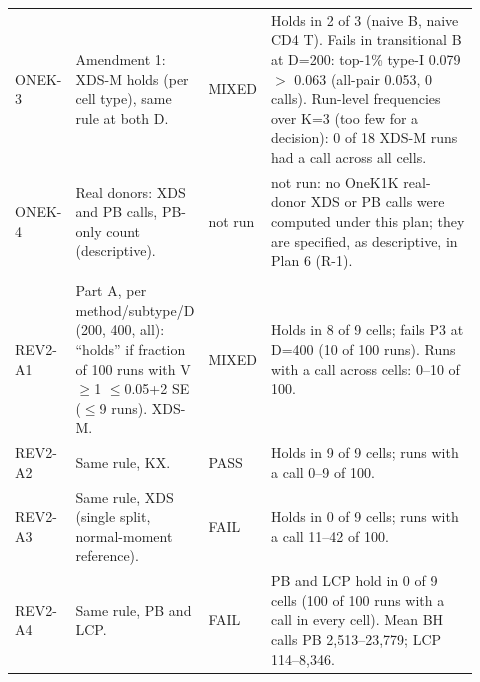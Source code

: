\begin{table}[p]
\begin{tabular}{@{}>{\raggedright\arraybackslash}p{0.100\linewidth}>{\raggedright\arraybackslash}p{0.285\linewidth}>{\raggedright\arraybackslash}p{0.085\linewidth}>{\raggedright\arraybackslash}p{0.450\linewidth}@{}}
ONEK-3 & Amendment 1: XDS-M holds (per cell type), same rule at both D. & MIXED & Holds in 2 of 3 (naive B, naive CD4 T). Fails in transitional B at D=200: top-1\% type-I 0.079 $>$ 0.063 (all-pair 0.053, 0 calls). Run-level frequencies over K=3 (too few for a decision): 0 of 18 XDS-M runs had a call across all cells. \\
ONEK-4 & Real donors: XDS and PB calls, PB-only count (descriptive). & not run & not run: no OneK1K real-donor XDS or PB calls were computed under this plan; they are specified, as descriptive, in Plan 6 (R-1). \\
\addlinespace[3pt]
\multicolumn{4}{@{}>{\raggedright\arraybackslash}p{0.90\linewidth}}{\textbf{Plan 3 (REV2\_PREREG), with amendment 1}} \\
\cmidrule(lr){1-4}
REV2-A1 & Part A, per method/subtype/D (200, 400, all): ``holds'' if fraction of 100 runs with V$\ge$1 $\le$0.05+2 SE ($\le$9 runs). XDS-M. & MIXED & Holds in 8 of 9 cells; fails P3 at D=400 (10 of 100 runs). Runs with a call across cells: 0--10 of 100. \\
REV2-A2 & Same rule, KX. & PASS & Holds in 9 of 9 cells; runs with a call 0--9 of 100. \\
REV2-A3 & Same rule, XDS (single split, normal-moment reference). & FAIL & Holds in 0 of 9 cells; runs with a call 11--42 of 100. \\
REV2-A4 & Same rule, PB and LCP. & FAIL & PB and LCP hold in 0 of 9 cells (100 of 100 runs with a call in every cell). Mean BH calls PB 2,513--23,779; LCP 114--8,346. \\
\bottomrule
\end{tabular}
\end{table}

